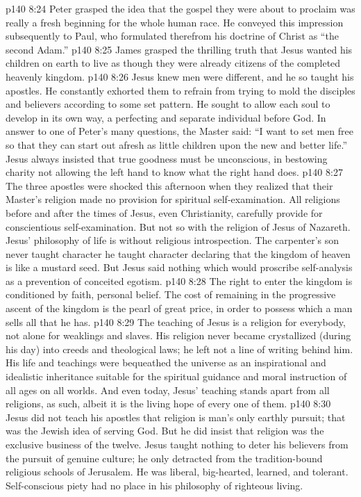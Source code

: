 \vs p140 8:24 Peter grasped the idea that the gospel they were about to proclaim was really a fresh beginning for the whole human race. He conveyed this impression subsequently to Paul, who formulated therefrom his doctrine of Christ as “the second Adam.”
\vs p140 8:25 James grasped the thrilling truth that Jesus wanted his children on earth to live as though they were already citizens of the completed heavenly kingdom.
\pc \vs p140 8:26 Jesus knew men were different, and he so taught his apostles. He constantly exhorted them to refrain from trying to mold the disciples and believers according to some set pattern. He sought to allow each soul to develop in its own way, a perfecting and separate individual before God. In answer to one of Peter’s many questions, the Master said: \textcolor{ubdarkred}{“I want to set men free so that they can start out afresh as little children upon the new and better life.”} Jesus always insisted that true goodness must be unconscious, in bestowing charity not allowing the left hand to know what the right hand does.
\vs p140 8:27 The three apostles were shocked this afternoon when they realized that their Master’s religion made no provision for spiritual self\hyp{}examination. All religions before and after the times of Jesus, even Christianity, carefully provide for conscientious self\hyp{}examination. But not so with the religion of Jesus of Nazareth. Jesus’ philosophy of life is without religious introspection. The carpenter’s son never taught character  he taught character  declaring that the kingdom of heaven is like a mustard seed. But Jesus said nothing which would proscribe self\hyp{}analysis as a prevention of conceited egotism.
\vs p140 8:28 The right to enter the kingdom is conditioned by faith, personal belief. The cost of remaining in the progressive ascent of the kingdom is the pearl of great price, in order to possess which a man sells all that he has.
\vs p140 8:29 The teaching of Jesus is a religion for everybody, not alone for weaklings and slaves. His religion never became crystallized (during his day) into creeds and theological laws; he left not a line of writing behind him. His life and teachings were bequeathed the universe as an inspirational and idealistic inheritance suitable for the spiritual guidance and moral instruction of all ages on all worlds. And even today, Jesus’ teaching stands apart from all religions, as such, albeit it is the living hope of every one of them.
\vs p140 8:30 Jesus did not teach his apostles that religion is man’s only earthly pursuit; that was the Jewish idea of serving God. But he did insist that religion was the exclusive business of the twelve. Jesus taught nothing to deter his believers from the pursuit of genuine culture; he only detracted from the tradition\hyp{}bound religious schools of Jerusalem. He was liberal, big\hyp{}hearted, learned, and tolerant. Self\hyp{}conscious piety had no place in his philosophy of righteous living.\plusone
